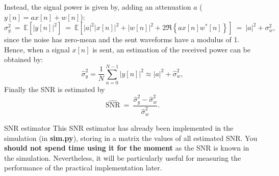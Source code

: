 Instead, the signal power is given by, adding an attenuation $a$ ($y[n]=a x[n] +w[n]$):
\begin{equation*}
    \sigma_y^2\:=\: \mathbb{E}\left[|y[n]|^2\right]\:=\:\mathbb{E}\left[ |a|^2 |x[n]|^2 + |w[n]|^2 + 2 \Re{\left\{a x[n] w^*[n]\right\}}\right]\:=\:|a|^2 + \sigma_w^2,
\end{equation*}
since the noise has zero-mean and the sent waveforms have a modulus of 1. Hence, when a signal $x[n]$ is sent, an estimation of the received power can be obtained by:
\begin{equation*}
    \widehat{\sigma}_y^2 = \frac{1}{N} \sum_{n=0}^{N-1} |y[n]|^2 \approx |a|^2 + \widehat{\sigma}_w^2,
\end{equation*}
 Finally the SNR is estimated by
\begin{equation*}
    \widehat{\text{SNR}}\:=\:\frac{\widehat{\sigma}_y^2 - \widehat{\sigma}_{w}^2}{\widehat{\sigma}_{w}^2}.
\end{equation*}
\begin{bclogo}[couleur = gray!20, arrondi = 0.2, logo=\bcinfo]{SNR estimator}
This SNR estimator has already been implemented in the simulation (in \textbf{sim.py}), storing in a matrix the values of all estimated SNR. You \textbf{should not spend time using it for the moment} as the SNR is known in the simulation. Nevertheless, it will be particularly useful for measuring the performance of the practical implementation later.
\end{bclogo}
